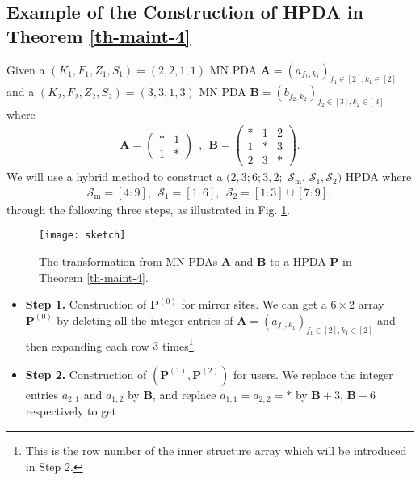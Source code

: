 \documentclass[onecolumn,10pt]{IEEEtran}
\theoremstyle{mythm}
\begin{document}
{\subsection{Example of the Construction of HPDA in Theorem \ref{th-maint-4}}
\label{sub-sketch}
Given a $(K_1,F_1,Z_1,S_1)=(2,2,1,1)$ MN PDA $\mathbf{A}=(a_{f_1,k_1})_{f_1\in[2], k_1\in[2]}$ and a $(K_2,F_2,Z_2,S_2)=(3,3,1,3)$ MN PDA $\mathbf{B}=(b_{f_2,k_2})_{f_2\in[3], k_2\in[3]}$ where
\begin{eqnarray}
\label{eq-three-array}
\mathbf{A}=\left(
\begin{array}{cc}
* & 1 \\
1 & *
\end{array}
\right) \ \ , \ \
\mathbf{B}=\left(
\begin{array}{ccc}
*	&	1	&	2\\
1	&	*	&	3\\
2	&	3	&	*
\end{array}
\right).
\end{eqnarray}
 We will use a hybrid method to construct a $(2,3;6;3,2;$ $\mathcal{S}_\text{m}$, $\mathcal{S}_\text{1},\mathcal{S}_\text{2})$ HPDA where
\begin{eqnarray}
\label{eq-alphabet-set}
\mathcal{S}_\text{m}=[4:9],\ \
\mathcal{S}_\text{1}=[1:6],\ \
\mathcal{S}_\text{2}=[1:3]\cup [7:9],
\end{eqnarray}
 through the following three steps, as illustrated in Fig. \ref{fig-sketch}.
\begin{figure}[http!]
\centering
\texttt{[image: sketch]}
\caption{ The transformation from MN PDAs $\mathbf{A}$ and $\mathbf{B}$ to a HPDA $\mathbf{P}$ in Theorem \ref{th-maint-4}.}
\label{fig-sketch}
\end{figure}
\begin{itemize}
\item\textbf{Step 1.} Construction of $\mathbf{P}^{(0)}$ for mirror sites. We can get a $6\times 2$ array $\mathbf{P}^{(0)}$ by deleting all the integer entries of $\mathbf{A}=(a_{f_1,k_1})_{f_1\in[2], k_1\in[2]}$ and then expanding each row $3$ times\footnote{\label{foot;ICM(20,2)}
		This is the row number of the inner structure array which will be introduced in Step 2.}.
\item\textbf{Step 2.} Construction of $\left(\mathbf{P}^{(1)},\mathbf{P}^{(2)}\right)$ for users. We replace the integer entries $a_{2,1}$ and $a_{1,2}$ by $\mathbf{B}$, and replace $a_{1,1}=a_{2,2}=*$ by $\mathbf{B}+3$, $\mathbf{B}+6$ respectively to get

\end{itemize}}
\end{document}
